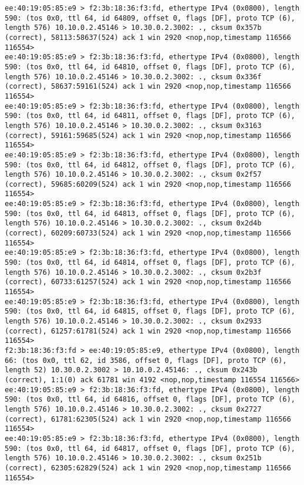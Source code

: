 \documentclass[a4paper,12pt]{article}
\begin{document}
\begin{Verbatim}
ee:40:19:05:85:e9 > f2:3b:18:36:f3:fd, ethertype IPv4 (0x0800), length 590: (tos 0x0, ttl 64, id 64809, offset 0, flags [DF], proto TCP (6), length 576) 10.10.0.2.45146 > 10.30.0.2.3002: ., cksum 0x357b (correct), 58113:58637(524) ack 1 win 2920 <nop,nop,timestamp 116566 116554>
ee:40:19:05:85:e9 > f2:3b:18:36:f3:fd, ethertype IPv4 (0x0800), length 590: (tos 0x0, ttl 64, id 64810, offset 0, flags [DF], proto TCP (6), length 576) 10.10.0.2.45146 > 10.30.0.2.3002: ., cksum 0x336f (correct), 58637:59161(524) ack 1 win 2920 <nop,nop,timestamp 116566 116554>
ee:40:19:05:85:e9 > f2:3b:18:36:f3:fd, ethertype IPv4 (0x0800), length 590: (tos 0x0, ttl 64, id 64811, offset 0, flags [DF], proto TCP (6), length 576) 10.10.0.2.45146 > 10.30.0.2.3002: ., cksum 0x3163 (correct), 59161:59685(524) ack 1 win 2920 <nop,nop,timestamp 116566 116554>
ee:40:19:05:85:e9 > f2:3b:18:36:f3:fd, ethertype IPv4 (0x0800), length 590: (tos 0x0, ttl 64, id 64812, offset 0, flags [DF], proto TCP (6), length 576) 10.10.0.2.45146 > 10.30.0.2.3002: ., cksum 0x2f57 (correct), 59685:60209(524) ack 1 win 2920 <nop,nop,timestamp 116566 116554>
ee:40:19:05:85:e9 > f2:3b:18:36:f3:fd, ethertype IPv4 (0x0800), length 590: (tos 0x0, ttl 64, id 64813, offset 0, flags [DF], proto TCP (6), length 576) 10.10.0.2.45146 > 10.30.0.2.3002: ., cksum 0x2d4b (correct), 60209:60733(524) ack 1 win 2920 <nop,nop,timestamp 116566 116554>
ee:40:19:05:85:e9 > f2:3b:18:36:f3:fd, ethertype IPv4 (0x0800), length 590: (tos 0x0, ttl 64, id 64814, offset 0, flags [DF], proto TCP (6), length 576) 10.10.0.2.45146 > 10.30.0.2.3002: ., cksum 0x2b3f (correct), 60733:61257(524) ack 1 win 2920 <nop,nop,timestamp 116566 116554>
ee:40:19:05:85:e9 > f2:3b:18:36:f3:fd, ethertype IPv4 (0x0800), length 590: (tos 0x0, ttl 64, id 64815, offset 0, flags [DF], proto TCP (6), length 576) 10.10.0.2.45146 > 10.30.0.2.3002: ., cksum 0x2933 (correct), 61257:61781(524) ack 1 win 2920 <nop,nop,timestamp 116566 116554>
f2:3b:18:36:f3:fd > ee:40:19:05:85:e9, ethertype IPv4 (0x0800), length 66: (tos 0x0, ttl 62, id 3586, offset 0, flags [DF], proto TCP (6), length 52) 10.30.0.2.3002 > 10.10.0.2.45146: ., cksum 0x243b (correct), 1:1(0) ack 61781 win 4192 <nop,nop,timestamp 116554 116566>
ee:40:19:05:85:e9 > f2:3b:18:36:f3:fd, ethertype IPv4 (0x0800), length 590: (tos 0x0, ttl 64, id 64816, offset 0, flags [DF], proto TCP (6), length 576) 10.10.0.2.45146 > 10.30.0.2.3002: ., cksum 0x2727 (correct), 61781:62305(524) ack 1 win 2920 <nop,nop,timestamp 116566 116554>
ee:40:19:05:85:e9 > f2:3b:18:36:f3:fd, ethertype IPv4 (0x0800), length 590: (tos 0x0, ttl 64, id 64817, offset 0, flags [DF], proto TCP (6), length 576) 10.10.0.2.45146 > 10.30.0.2.3002: ., cksum 0x251b (correct), 62305:62829(524) ack 1 win 2920 <nop,nop,timestamp 116566 116554>

\end{Verbatim}
\end{document}
